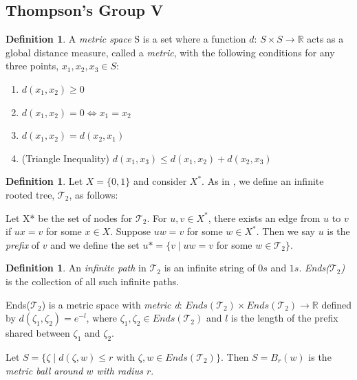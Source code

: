 \documentclass[11pt]{amsart}
\newcommand{\br}{\ensuremath{\mathbb{R}}} %
\theoremstyle{plain}
\theoremstyle{remark}
\theoremstyle{definition}
\newtheorem{definition}[theorem]{Definition}
\theoremstyle{remark}
\theoremstyle{named}
\begin{document}
\subsection{Thompson's Group V}
\begin{definition}
A \textit{metric space} S is a set where a function $d$: $S \times S \to \br$ acts as a global distance measure, called a \emph{metric}, with the following conditions for any three points, $x_{1},x_{2},x_{3} \in S$: 
\begin{enumerate}
\item $d(x_{1},x_{2}) \geq 0$
\item $d(x_{1},x_{2}) = 0 \iff x_{1} = x_{2}$
\item $d(x_{1},x_{2}) = d(x_{2},x_{1})$
\item (Triangle Inequality) $d(x_{1},x_{3})\leq d(x_{1},x_{2}) + d(x_{2},x_{3})$
\end{enumerate}
\end{definition}
\begin{definition}
Let $X = \{0,1\}$ and consider $X^*$. As in \cite{Bleak1}, we define an infinite rooted tree, $\mathcal{T}_2$, as follows:

Let X* be the set of nodes for $\mathcal{T}_2$. For $u, v \in X^*$, there exists an edge from $u$ to $v$ if $ux = v$ for some $x \in X$. Suppose $uw = v$ for some $w \in X^*$. Then we say $u$ is the \emph{prefix} of $v$ and we define the set $u* = \{v \mid uw = v$ for some $w \in \mathcal{T}_2\}$.
\end{definition}
\begin{figure}[h]
\end{figure}
\begin{definition}
An \emph{infinite path} in $\mathcal{T}_2$ is an infinite string of $0s$ and $1s$. \emph{Ends($\mathcal{T}_2$)} is the collection of all such infinite paths.

Ends($\mathcal{T}_2$) is a metric space with \emph{metric d}: $Ends(\mathcal{T}_2) \times Ends(\mathcal{T}_2) \rightarrow \mathbb{R}$
defined by $d(\zeta_1,\zeta_2) = e^{-l}$, where $\zeta_1, \zeta_2 \in Ends(\mathcal{T}_2)$ and $l$ is the length of the prefix shared between $\zeta_1$ and $\zeta_2$.

Let $S= \{\zeta \mid d(\zeta,w) \leq r \text{ with } \zeta, w \in Ends(\mathcal{T}_2)\}.$ Then $S = B_{r}(w)$ is the \emph{metric ball around $w$ with radius $r$}.
\end{definition}
\end{document}

